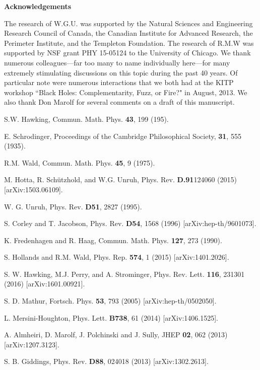 \documentclass[12pt,nofootinbib,amsmath,amssymb,amsfonts,aps,prd,groupedaddress]{revtex4-1}
\begin{document}
\bigskip
\noindent
{\bf Acknowledgements}

The research of W.G.U. was supported by the Natural Sciences and Engineering Research Council of Canada, the Canadian Institute for Advanced Research, the Perimeter Institute, and the
Templeton Foundation. The research of R.M.W was supported by NSF grant PHY 15-05124 to the University of Chicago. We thank numerous colleagues---far too many to name individually here---for many extremely stimulating discussions on this topic during the past 40 years. Of particular note were numerous interactions that we both had at the KITP workshop ``Black Holes: Complementarity, Fuzz, or Fire?" in August, 2013. We also thank Don Marolf for several comments on a draft of this manuscript.


\begin{thebibliography}{99}

S.W. Hawking, Commun. Math. Phys. {\bf 43}, 199 (195).

E. Schrodinger, Proceedings of the Cambridge Philosophical Society, {\bf 31}, 555 (1935).

R.M. Wald, Commun. Math. Phys. {\bf 45}, 9 (1975).

M. Hotta, R. Schützhold, and W.G. Unruh, Phys. Rev. {\bf D.91}124060 (2015) [arXiv:1503.06109].

W. G. Unruh, Phys. Rev. {\bf D51}, 2827 (1995).

S. Corley and T. Jacobson, Phys. Rev. {\bf D54}, 1568 (1996) [arXiv:hep-th/9601073].

K. Fredenhagen and R. Haag, Commun. Math. Phys. {\bf 127}, 273 (1990).

S. Hollands and R.M. Wald, Phys. Rep. {\bf 574}, 1 (2015) [arXiv:1401.2026].

S. W. Hawking, M.J. Perry, and A. Strominger, Phys. Rev. Lett. {\bf 116}, 231301 (2016) [arXiv:1601.00921].

S. D. Mathur, Fortsch. Phys. {\bf 53}, 793 (2005) [arXiv:hep-th/0502050].

L. Mersini-Houghton, Phys. Lett. {\bf B738}, 61 (2014) [arXiv:1406.1525].

A. Almheiri, D. Marolf, J. Polchinski and J. Sully,  JHEP {\bf 02}, 062 (2013) [arXiv:1207.3123].

S. B. Giddings, Phys. Rev. {\bf D88}, 024018 (2013)  [arXiv:1302.2613].


\end{thebibliography}
\end{document}
